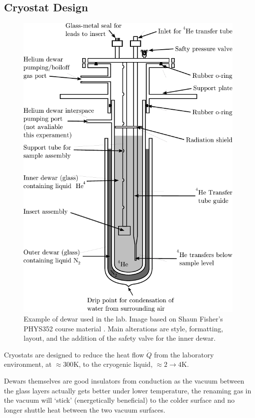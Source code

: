 \subsection{Cryostat Design}
\begin{figure}[htbp]
\centering
\includegraphics{pics/dewar.pdf}
\caption{Example of dewar used in the lab. Image based on Shaun Fisher's PHYS352 course material \cite{dewarimage}.
Main alterations are style, formatting, layout, and the addition of the safety valve for the inner dewar. \label{fig:dewar}}
\end{figure}
Cryostats are designed to reduce the heat flow $\dot{Q}$ from the laboratory environment, at $\approx 300$K,
to the cryogenic liquid, $\approx 2\to4$K. 

Dewars themselves are good insulators from conduction as the vacuum between the 
glass layers actually gets better under lower temperature, the renaming gas
in the vacuum  will `stick' (energetically beneficial) to
the colder surface and no longer shuttle heat between the two vacuum surfaces.

